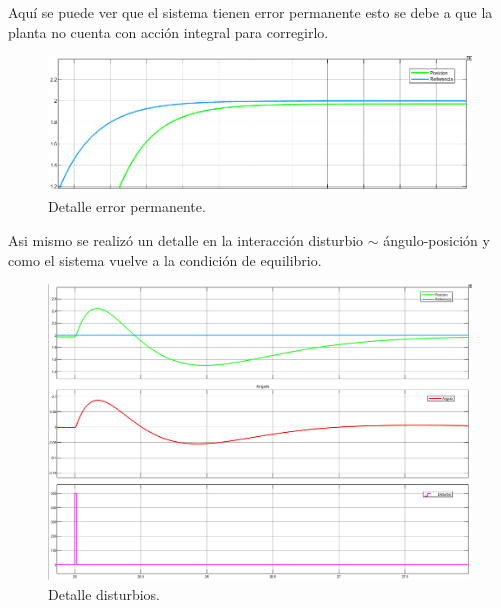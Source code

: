 Aquí se puede ver que el sistema tienen error permanente esto se debe a que la planta no cuenta con acción integral para corregirlo.
\begin{figure}[H]
	\centering
	\includegraphics[width=1\linewidth]{Imagenes/Control_por_realimentacion/detalle_error_permanente.png}
	\caption{Detalle error permanente.}
	\label{realmentacion_error}
\end{figure}

Asi mismo se realizó un detalle en la interacción disturbio $\sim$ ángulo-posici\'on y como el sistema vuelve a la condici\'on de equilibrio.
\begin{figure}[H]
	\centering
	\includegraphics[width=1\linewidth]{Imagenes/Control_por_realimentacion/detalle_disturbio.png}
	\caption{Detalle disturbios.}
	\label{realmentacion_disturbio}
\end{figure}


